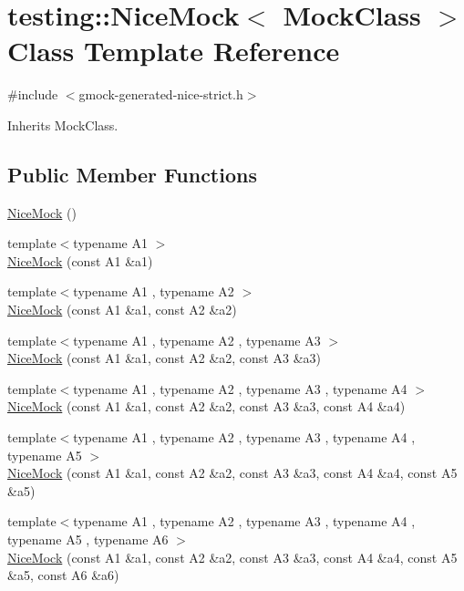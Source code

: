 \hypertarget{classtesting_1_1NiceMock}{}\section{testing\+::Nice\+Mock$<$ Mock\+Class $>$ Class Template Reference}
\label{classtesting_1_1NiceMock}


{\ttfamily \#include $<$gmock-\/generated-\/nice-\/strict.\+h$>$}



Inherits Mock\+Class.

\subsection*{Public Member Functions}
\begin{DoxyCompactItemize}
\item 
\mbox{\hyperlink{classtesting_1_1NiceMock_a10bbd6ebe779ac8ab1f9f3ae2dee9310}{Nice\+Mock}} ()
\item 
{\footnotesize template$<$typename A1 $>$ }\\\mbox{\hyperlink{classtesting_1_1NiceMock_a2d6b9cb9d929d1af4532b69c7ef19df6}{Nice\+Mock}} (const A1 \&a1)
\item 
{\footnotesize template$<$typename A1 , typename A2 $>$ }\\\mbox{\hyperlink{classtesting_1_1NiceMock_a150837476e88f52772c8f85180b889a1}{Nice\+Mock}} (const A1 \&a1, const A2 \&a2)
\item 
{\footnotesize template$<$typename A1 , typename A2 , typename A3 $>$ }\\\mbox{\hyperlink{classtesting_1_1NiceMock_a0b91bd74b497626bb81d07c3d4b59d22}{Nice\+Mock}} (const A1 \&a1, const A2 \&a2, const A3 \&a3)
\item 
{\footnotesize template$<$typename A1 , typename A2 , typename A3 , typename A4 $>$ }\\\mbox{\hyperlink{classtesting_1_1NiceMock_a5ffbe1a648f16612266d4e67a2d063d1}{Nice\+Mock}} (const A1 \&a1, const A2 \&a2, const A3 \&a3, const A4 \&a4)
\item 
{\footnotesize template$<$typename A1 , typename A2 , typename A3 , typename A4 , typename A5 $>$ }\\\mbox{\hyperlink{classtesting_1_1NiceMock_a3812c0ba0d743f9a0c3d276dfc076f4c}{Nice\+Mock}} (const A1 \&a1, const A2 \&a2, const A3 \&a3, const A4 \&a4, const A5 \&a5)
\item 
{\footnotesize template$<$typename A1 , typename A2 , typename A3 , typename A4 , typename A5 , typename A6 $>$ }\\\mbox{\hyperlink{classtesting_1_1NiceMock_a156d0fce85ac08abffdf4aa0c3975f81}{Nice\+Mock}} (const A1 \&a1, const A2 \&a2, const A3 \&a3, const A4 \&a4, const A5 \&a5, const A6 \&a6)

\end{DoxyCompactItemize}
